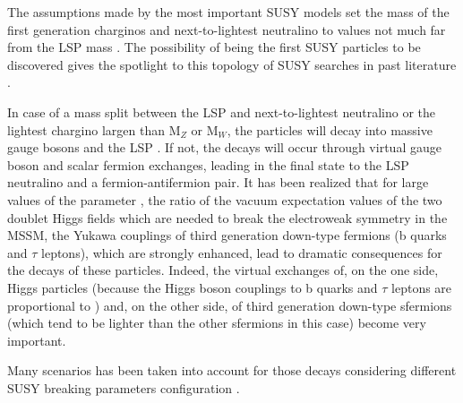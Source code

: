\FloatBarrier

The assumptions made by the most important SUSY models set the mass of the first generation charginos \charginopm and next-to-lightest neutralino \neutralinotwo to values not much far from the LSP mass \neutralinoone. The possibility of being the first SUSY particles to be discovered gives the spotlight to this topology of SUSY searches in past literature \cite{Abel:2000vs}. 

In case of a mass split between the LSP and next-to-lightest neutralino \neutralinotwo or the lightest chargino \charginopm largen than $\text{M}_{Z}$ or $\text{M}_{W}$, the particles will decay into massive gauge bosons and the LSP \neutralinoone. If not, the decays will occur through virtual gauge boson and scalar fermion exchanges, leading in the final state to the LSP neutralino and a fermion-antifermion pair. It has been realized \cite{Baer:1998bj, Baer:1998sz, Bartl:1999iw, Djouadi:2000aq} that for large values of the parameter \tanbeta, the ratio of the vacuum expectation values of the two doublet Higgs fields which are needed to break the electroweak symmetry in the MSSM, the Yukawa couplings of third generation down-type fermions (b quarks and $\tau$ leptons), which are strongly enhanced, lead to dramatic consequences for the decays of these particles. Indeed, the virtual exchanges of, on the one side, Higgs particles (because the Higgs boson couplings to b quarks and $\tau$ leptons are proportional to \tanbeta) and, on the other side, of third generation down-type sfermions (which tend to be lighter than the other sfermions in this case) become very important.

Many scenarios has been taken into account for those decays considering different SUSY breaking parameters configuration \cite{Djouadi:2001fa}. 

